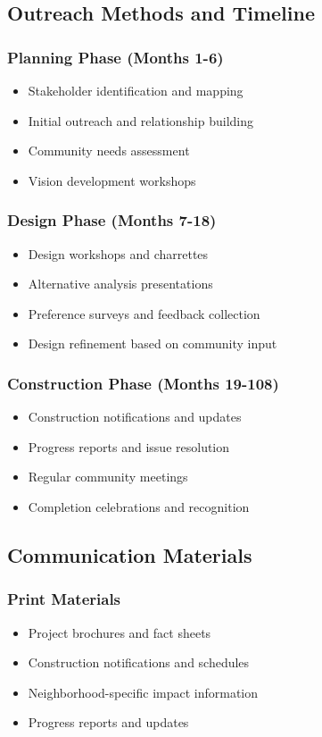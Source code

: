 \documentclass[11pt,letterpaper]{article}
\begin{document}
\subsection{Outreach Methods and Timeline}

\subsubsection{Planning Phase (Months 1-6)}
\begin{itemize}
    \item Stakeholder identification and mapping
    \item Initial outreach and relationship building
    \item Community needs assessment
    \item Vision development workshops
\end{itemize}

\subsubsection{Design Phase (Months 7-18)}
\begin{itemize}
    \item Design workshops and charrettes
    \item Alternative analysis presentations
    \item Preference surveys and feedback collection
    \item Design refinement based on community input
\end{itemize}

\subsubsection{Construction Phase (Months 19-108)}
\begin{itemize}
    \item Construction notifications and updates
    \item Progress reports and issue resolution
    \item Regular community meetings
    \item Completion celebrations and recognition
\end{itemize}

\subsection{Communication Materials}

\subsubsection{Print Materials}
\begin{itemize}
    \item Project brochures and fact sheets
    \item Construction notifications and schedules
    \item Neighborhood-specific impact information
    \item Progress reports and updates
\end{itemize}
\end{document}
